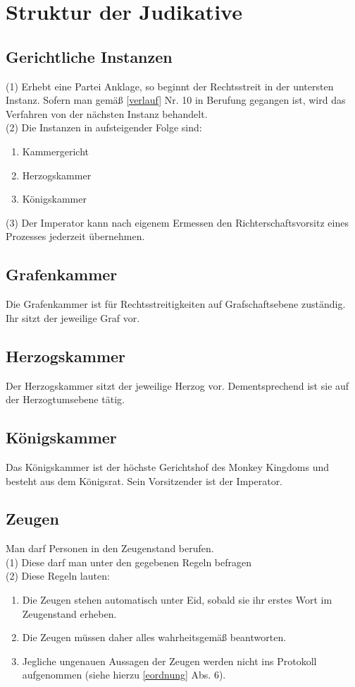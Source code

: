\documentclass{article}
\begin{document}
\section{Struktur der Judikative}

\subsection{Gerichtliche Instanzen}
(1) Erhebt eine Partei Anklage, so beginnt der Rechtsstreit in der untersten Instanz. Sofern man gemäß \ref{verlauf} Nr. 10 in Berufung gegangen ist, wird das Verfahren von der nächsten Instanz behandelt.\\
(2) Die Instanzen in aufsteigender Folge sind:
\begin{enumerate}
	\item Kammergericht
	\item Herzogskammer
	\item Königskammer
\end{enumerate}
(3) Der Imperator kann nach eigenem Ermessen den Richterschaftsvorsitz eines Prozesses jederzeit übernehmen.

\subsection{Grafenkammer}
Die Grafenkammer ist für Rechtsstreitigkeiten auf Grafschaftsebene zuständig. Ihr sitzt der jeweilige Graf vor.

\subsection{Herzogskammer}
Der Herzogskammer sitzt der jeweilige Herzog vor. Dementsprechend ist sie auf der Herzogtumsebene tätig.

\subsection{Königskammer}
Das Königskammer ist der höchste Gerichtshof des Monkey Kingdoms und besteht aus dem Königsrat. Sein Vorsitzender ist der Imperator.

\subsection{Zeugen}\label{zeugen}
Man darf Personen in den Zeugenstand berufen.\\
(1) Diese darf man unter den gegebenen Regeln befragen  \\
(2) Diese Regeln lauten:  \\
\begin{enumerate}
	\item Die Zeugen stehen automatisch unter Eid, sobald sie ihr erstes Wort im Zeugenstand erheben.
	\item Die Zeugen müssen daher alles wahrheitsgemäß beantworten.
	\item Jegliche ungenauen Aussagen der Zeugen werden nicht ins Protokoll aufgenommen (siehe hierzu \ref{eordnung} Abs. 6).
\end{enumerate}
\end{document}
